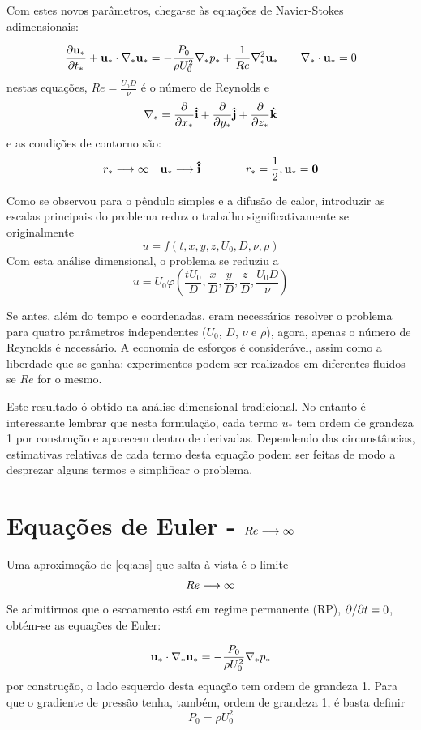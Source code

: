 Com estes novos parâmetros, chega-se às equações de Navier-Stokes adimensionais:

\begin{equation}
\frac{\partial \mathbf{u}_*}{\partial t_*} +  \mathbf{u}_*\cdot\nabla_* \mathbf{u_*} = -\frac{P_0}{\rho U_0^2}\nabla_* p_* + \frac{1}{Re}\nabla_*^2 \mathbf{u}_* \qquad \nabla_*\cdot \mathbf{u}_* = 0
\label{eq:ans}
\end{equation}
nestas equações, $Re = \frac{U_0 D}{\nu}$ é o número de Reynolds e 
\[
\nabla_* = \frac{\partial}{\partial x_*}  \mathbf{\hat{i}} + \frac{\partial}{\partial y_*}  \mathbf{\hat{j}} + \frac{\partial}{\partial z_*}  \mathbf{\hat{k}}
\]
e as condições de contorno são:
\[
 r_*\longrightarrow\infty \quad  \mathbf{u}_*\longrightarrow  \mathbf{\hat{i}} \qquad\qquad r_*=\frac{1}{2},  \mathbf{u}_* =  \mathbf{0}
\]

Como se observou para o pêndulo simples e a difusão de calor, introduzir as escalas principais do problema reduz o trabalho significativamente se originalmente
\[
u = f(t, x, y, z, U_0, D, \nu, \rho)
\]
Com esta análise dimensional, o problema se reduziu a 
\[
u = U_0 \varphi\left(\frac{t U_0}{D}, \frac{x}{D}, \frac{y}{D}, \frac{z}{D}, \frac{U_0 D}{\nu}\right)
\]

Se antes, além do tempo e coordenadas,  eram  necessários resolver o problema para quatro parâmetros independentes ($U_0$, $D$, $\nu$ e $\rho$), agora, apenas o número de Reynolds é necessário. A economia de esforços é considerável, assim como a liberdade que se ganha: experimentos podem ser realizados em diferentes fluidos se $Re$ for o mesmo.

Este resultado ó obtido na análise dimensional tradicional. No entanto é interessante lembrar que nesta formulação, cada termo $u_*$ tem ordem de grandeza 1 por construção e aparecem dentro de derivadas. Dependendo das circunstâncias, estimativas relativas de cada termo desta equação podem ser feitas de modo a desprezar alguns termos e simplificar o problema.

\section{Equações de Euler - $Re\longrightarrow\infty$}

Uma aproximação de \ref{eq:ans} que salta à vista é o limite 
\[
Re \longrightarrow\infty
\]
Se admitirmos que o escoamento está em regime permanente (RP), $\partial/\partial t = 0$, obtém-se as equações de Euler:

\begin{equation}
\p{u}_*\cdot\nabla_*\p{u_*} = -\frac{P_0}{\rho U_0^2}\nabla_* p_* %
\label{eq:euler}
\end{equation}
por construção, o lado esquerdo desta equação tem ordem de grandeza 1. Para que o gradiente de pressão tenha, também, ordem de grandeza 1, é basta definir  
\[
P_0 = \rho U_0^2
\]

